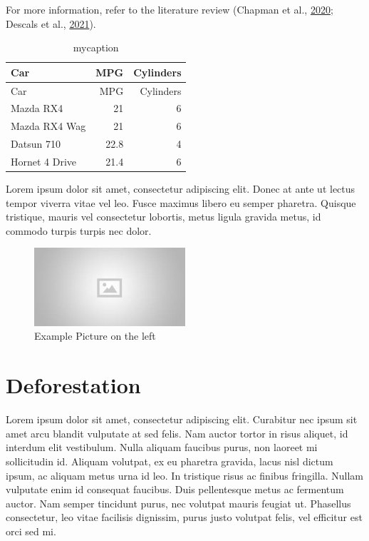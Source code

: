 \documentclass[
  letterpaper,
  DIV=11,
  numbers=noendperiod]{scrreprt}
\begin{document}
For more information, refer to the literature review (Chapman et al.,
\protect\hyperlink{ref-chapmanCompoundingImpactDeforestation2020}{2020};
Descals et al.,
\protect\hyperlink{ref-descalsHighresolutionGlobalMap2021}{2021}).

\hypertarget{tbl-mytable2}{}
\begin{longtable}[]{@{}lrr@{}}
\caption{\label{tbl-mytable2}mycaption}\tabularnewline
\toprule\noalign{}
Car & MPG & Cylinders \\
\midrule\noalign{}
\endfirsthead
\toprule\noalign{}
Car & MPG & Cylinders \\
\midrule\noalign{}
\endhead
\bottomrule\noalign{}
\endlastfoot
Mazda RX4 & 21 & 6 \\
Mazda RX4 Wag & 21 & 6 \\
Datsun 710 & 22.8 & 4 \\
Hornet 4 Drive & 21.4 & 6 \\
\end{longtable}

Lorem ipsum dolor sit amet, consectetur adipiscing elit. Donec at ante
ut lectus tempor viverra vitae vel leo. Fusce maximus libero eu semper
pharetra. Quisque tristique, mauris vel consectetur lobortis, metus
ligula gravida metus, id commodo turpis turpis nec dolor.

\begin{figure}

\includegraphics[width=0.5\textwidth,height=\textheight]{text/placeholder.jpg} \hfill{}

\caption{Example Picture on the left}

\end{figure}

\hypertarget{deforestation}{%
\section{Deforestation}\label{deforestation}}

Lorem ipsum dolor sit amet, consectetur adipiscing elit. Curabitur nec
ipsum sit amet arcu blandit vulputate at sed felis. Nam auctor tortor in
risus aliquet, id interdum elit vestibulum. Nulla aliquam faucibus
purus, non laoreet mi sollicitudin id. Aliquam volutpat, ex eu pharetra
gravida, lacus nisl dictum ipsum, ac aliquam metus urna id leo. In
tristique risus ac finibus fringilla. Nullam vulputate enim id consequat
faucibus. Duis pellentesque metus ac fermentum auctor. Nam semper
tincidunt purus, nec volutpat mauris feugiat ut. Phasellus consectetur,
leo vitae facilisis dignissim, purus justo volutpat felis, vel efficitur
est orci sed mi.
\end{document}
